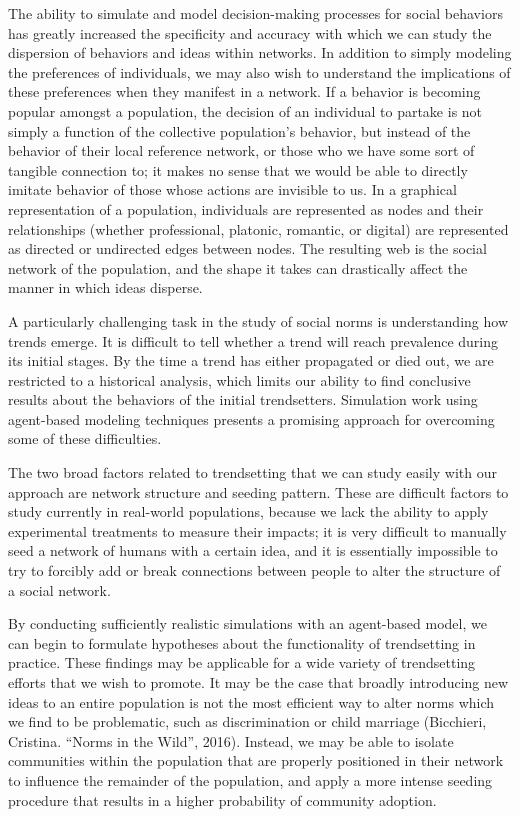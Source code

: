 \documentclass[11pt]{article}
\begin{document}
The ability to simulate and model decision-making processes for social
behaviors has greatly increased the specificity and accuracy with which
we can study the dispersion of behaviors and ideas within networks. In
addition to simply modeling the preferences of individuals, we may also
wish to understand the implications of these preferences when they
manifest in a network. If a behavior is becoming popular amongst a
population, the decision of an individual to partake is not simply a
function of the collective population's behavior, but instead of the
behavior of their local reference network, or those who we have some
sort of tangible connection to; it makes no sense that we would be able
to directly imitate behavior of those whose actions are invisible to us.
In a graphical representation of a population, individuals are
represented as nodes and their relationships (whether professional,
platonic, romantic, or digital) are represented as directed or
undirected edges between nodes. The resulting web is the social network
of the population, and the shape it takes can drastically affect the
manner in which ideas disperse.

A particularly challenging task in the study of social norms is
understanding how trends emerge. It is difficult to tell whether a trend
will reach prevalence during its initial stages. By the time a trend has
either propagated or died out, we are restricted to a historical
analysis, which limits our ability to find conclusive results about the
behaviors of the initial trendsetters. Simulation work using agent-based
modeling techniques presents a promising approach for overcoming some of
these difficulties.

The two broad factors related to trendsetting that we can study easily
with our approach are network structure and seeding pattern. These are
difficult factors to study currently in real-world populations, because
we lack the ability to apply experimental treatments to measure their
impacts; it is very difficult to manually seed a network of humans with
a certain idea, and it is essentially impossible to try to forcibly add
or break connections between people to alter the structure of a social
network.

By conducting sufficiently realistic simulations with an agent-based
model, we can begin to formulate hypotheses about the functionality of
trendsetting in practice. These findings may be applicable for a wide
variety of trendsetting efforts that we wish to promote. It may be the
case that broadly introducing new ideas to an entire population is not
the most efficient way to alter norms which we find to be problematic,
such as discrimination or child marriage (Bicchieri, Cristina. ``Norms
in the Wild'', 2016). Instead, we may be able to isolate communities
within the population that are properly positioned in their network to
influence the remainder of the population, and apply a more intense
seeding procedure that results in a higher probability of community
adoption.
\end{document}

